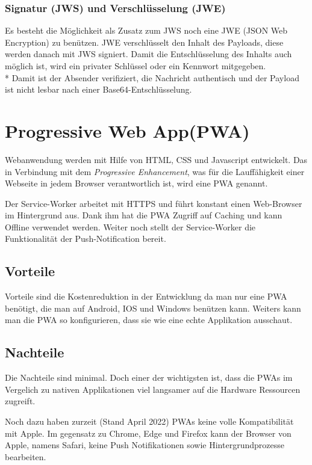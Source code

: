 \subsubsection{Signatur (JWS) und Verschlüsselung (JWE)}
Es besteht die Möglichkeit als Zusatz zum JWS noch eine JWE (JSON Web Encryption) zu benützen. JWE verschlüsselt den Inhalt des Payloads, diese werden danach mit JWS signiert.
Damit die Entschlüsselung des Inhalts auch möglich ist, wird ein privater Schlüssel oder ein Kennwort mitgegeben. \\*
Damit ist der Absender verifiziert, die Nachricht authentisch und der Payload ist nicht lesbar nach einer Base64-Entschlüsselung. \cite{JWTIONOS}


\section{Progressive Web App(PWA)}
\author{Bozidar Spasenovic}
Webanwendung werden mit Hilfe von HTML, CSS und Javascript entwickelt. 
Das in Verbindung mit dem \textit{Progressive Enhancement}, was für die Lauffähigkeit einer Webseite in jedem Browser verantwortlich ist, wird eine PWA genannt. 

Der Service-Worker arbeitet mit HTTPS und führt konstant einen Web-Browser im Hintergrund aus.
Dank ihm hat die PWA Zugriff auf Caching und kann Offline verwendet werden. 
Weiter noch stellt der Service-Worker die Funktionalität der Push-Notification bereit.  

\subsection{Vorteile}
\author{Bozidar Spasenovic}
Vorteile sind die Kostenreduktion in der Entwicklung da man nur eine PWA benötigt, die man auf Android, IOS und Windows benützen kann.
Weiters kann man die PWA so konfigurieren, dass sie wie eine echte Applikation ausschaut.

\subsection{Nachteile}
\author{Bozidar Spasenovic}
Die Nachteile sind minimal. Doch einer der wichtigsten ist, dass die PWAs im Vergelich zu nativen Applikationen viel langsamer auf die
Hardware Ressourcen zugreift. 

Noch dazu haben zurzeit (Stand April 2022) PWAs keine volle Kompatibilität mit Apple. Im gegensatz zu Chrome, Edge und Firefox
kann der Browser von Apple, namens Safari, keine Push Notifikationen sowie Hintergrundprozesse bearbeiten.

